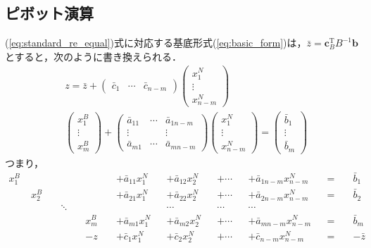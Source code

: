 \documentclass{jsreport}
\begin{document}
\subsection{ピボット演算}
(\ref{eq:standard_re_equal})式に対応する基底形式(\ref{eq:basic_form})は，$\bar{z} = \bm{c}_B^{\mathrm{T}}B^{-1}\bm{b}$とすると，次のように書き換えられる．
\begin{align}
  &z = \bar{z} + \left(
  \begin{array}{ccc}
    \bar{c}_1 & \cdots & \bar{c}_{n - m}
  \end{array}
  \right) \left(
  \begin{array}{c}
    x_1^N \\
    \vdots \\
    x_{n-m}^N
  \end{array}
  \right) \nonumber \\
  &\left(
  \begin{array}{c}
    x_1^B \\
    \vdots \\
    x_m^B
  \end{array}
  \right) + \left(
  \begin{array}{ccc}
    \bar{a}_{11} & \cdots & \bar{a}_{1 n-m} \\
    \vdots & & \vdots \\
    \bar{a}_{m1} & \cdots & \bar{a}_{m n-m}
  \end{array}
  \right) \left(
  \begin{array}{c}
    x_1^N \\
    \vdots \\
    x_{n-m}^N
  \end{array}
  \right) = \left(
  \begin{array}{c}
    \bar{b}_1 \\
    \vdots \\
    \bar{b}_m
  \end{array}
  \right) \nonumber
\end{align}
つまり，
\begin{equation}
    \begin{alignedat}{9}
      x_1^B \; &          & &           & &          & &+\bar{a}_{11}x_1^N & &+\bar{a}_{12}x_2^N & &+\cdots & &+\bar{a}_{1 n-m}x_{n-m}^N & &= \; & &\bar{b}_1   \\
               & x_2^B \; & &           & &          & &+\bar{a}_{21}x_1^N & &+\bar{a}_{22}x_2^N & &+\cdots & &+\bar{a}_{2 n-m}x_{n-m}^N & &= \; & &\bar{b}_2   \\
               &          & & \ddots \; & &          & &                   & &\cdots             & &\cdots  & &\cdots                    & &     & & \\
               &          & &           & & x_m^B \; & &+\bar{a}_{m1}x_1^N & &+\bar{a}_{m2}x_2^N & &+\cdots & &+\bar{a}_{m n-m}x_{n-m}^N & &= \; & &\bar{b}_m  \\
               &          & &           & & -z \;    & &+\bar{c}_{1}x_1^N  & &+\bar{c}_{2}x_2^N  & &+\cdots & &+\bar{c}_{n-m}x_{n-m}^N   & &= \; & &-\bar{z}
    \end{alignedat}
\end{equation}
\end{document}
